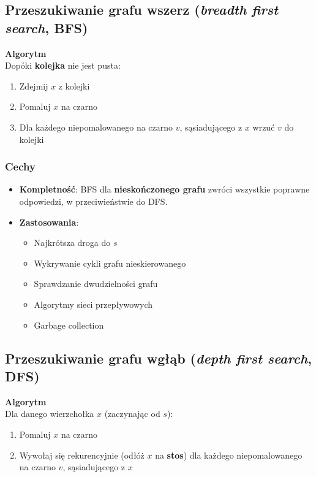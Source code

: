 \documentclass[main.tex]{subfiles}
\begin{document}
    \subsection{Przeszukiwanie grafu wszerz (\textit{breadth first search}, BFS)}

    \noindent \textbf{Algorytm}\\
    Dopóki \textbf{kolejka} nie jest pusta:
    \begin{enumerate}[noitemsep]
        \item Zdejmij $x$ z kolejki
        \item Pomaluj $x$ na czarno
        \item Dla każdego niepomalowanego na czarno $v$, sąsiadującego z $x$ wrzuć
        $v$ do kolejki
    \end{enumerate}

    \subsubsection{Cechy}

    \begin{itemize}[noitemsep]
        \item \textbf{Kompletność}: BFS dla \textbf{nieskończonego grafu} zwróci wszystkie poprawne
        odpowiedzi, w przeciwieństwie do DFS.

        \item \textbf{Zastosowania}:
        \begin{itemize}[noitemsep]
            \item Najkrótsza droga do $s$
            \item Wykrywanie cykli grafu nieskierowanego
            \item Sprawdzanie dwudzielności grafu
            \item Algorytmy sieci przepływowych
            \item Garbage collection
        \end{itemize}
    \end{itemize}

    \subsection{Przeszukiwanie grafu wgłąb (\textit{depth first search}, DFS)}

    \noindent \textbf{Algorytm}\\
    Dla danego wierzchołka $x$ (zaczynając od $s$):
    \begin{enumerate}[noitemsep]
        \item Pomaluj $x$ na czarno
        \item Wywołaj się rekurencyjnie (odłóż $x$ na \textbf{stos}) dla każdego niepomalowanego na czarno $v$,
        sąsiadującego z $x$
    \end{enumerate}
\end{document}
